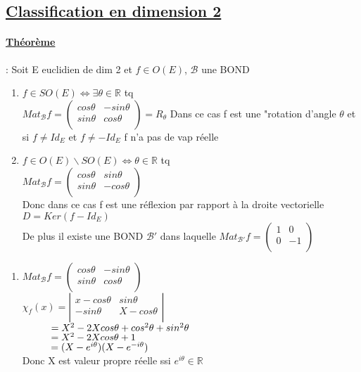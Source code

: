 \documentclass{article}
\newcommand\tab[1][1cm]{\hspace*{#1}}
\begin{document}
\subsection{\underline{Classification en dimension 2}}

\paragraph{\underline{Théorème}}: Soit E euclidien de dim 2 et $f \in O(E)$, $\mathcal{B}$ une BOND
\begin{enumerate}
    \item $f \in SO(E) \Leftrightarrow \exists \theta \in \mathbb{R}$ tq\\
$Mat_{\mathcal{B}} f = \begin{pmatrix}
    cos \theta & -sin \theta\\
    sin \theta & cos \theta\\
\end{pmatrix} = R_\theta$
Dans ce cas f est une "rotation d'angle $\theta$ et si $f \neq Id_E$ et $f \neq -Id_E$ f n'a pas de vap réelle
    \item $f \in O(E) \backslash SO(E) \Leftrightarrow \theta \in \mathbb{R}$ tq\\
    $Mat_{\mathcal{B}} f = \begin{pmatrix}
        cos \theta & sin \theta\\
        sin \theta & -cos \theta\\
\end{pmatrix}$\\
Donc dans ce cas f est une réflexion par rapport à la droite vectorielle $D = Ker(f - Id_E)$\\
De plus il existe une BOND $\mathcal{B}'$ dans laquelle $Mat_{\mathcal{B}'} f = \begin{pmatrix}
    1 & 0\\
    0 & -1\\
\end{pmatrix}$
\end{enumerate}

\begin{enumerate}
    \item $Mat_{\mathcal{B}} f = \begin{pmatrix}
    cos \theta & -sin \theta\\
    sin \theta & cos \theta\\
\end{pmatrix}$\\
$\chi_f(x) = \left| \begin{matrix}
        x - cos \theta & sin \theta\\
        -sin \theta & X - cos \theta\\
    \end{matrix}
\right|$\\
$\tab = X^2 -2X cos \theta + cos^2 \theta + sin^2 \theta$\\
$\tab = X^2 -2X cos \theta + 1$\\
$\tab = (X - e^{i\theta})(X - e^{-i \theta})$\\
Donc X est valeur propre réelle ssi $e^{i\theta} \in \mathbb{R}$
\end{enumerate}
\end{document}

